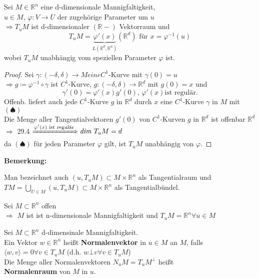 \begin{sa}
Sei $M \in \mathbb{R}^n $ eine d-dimensionale Mannigfaltigkeit, \\
$u \in M $, $ \varphi : V \rightarrow U $ der zugehörige Parameter um $u$ \\
$\Longrightarrow T_uM $ ist d-dimensionaler $( \mathbb{R}-) $ Vektorraum und \\
    \begin{equation}
    T_uM = \underbrace{\varphi'(x)}_{L \left( \mathbb{R}^d, \mathbb{R}^n \right) }
    \left( \mathbb{R}^d \right) \text{ für } x = \varphi^{-1} (u) 
    \end{equation}
wobei $T_uM$ unabhängig vom speziellen Parameter $\varphi$ ist.
\end{sa}

\begin{proof}
Sei $\gamma: (-\delta, \delta) \rightarrow M eine C^1$-Kurve mit $\gamma(0) = u $ \\
$\Rightarrow g \coloneqq \varphi^{-1} \circ \gamma $ ist $C^1$-Kurve, 
$g: (-\delta, \delta) \rightarrow \mathbb{R}^d $ mit $ g(0) = x $ und
    \begin{equation*}
    \gamma' (0) = \varphi' (x) g'(0) \text{, } \varphi' (x) \text{ist regulär.}
    \tag{$\spadesuit$}
    \end{equation*}
Offenb. liefert auch jede $C^1$-Kurve $g$ in $\mathbb{R}^d $ durch $x$
eine $C^1$-Kurve $\gamma$ in $M$ mit $(\spadesuit)$ \\
Die Menge aller Tangentialvektoren $g'(0)$ von $C^1$-Kurven $g$ in $\mathbb{R}^d $
ist offenbar $\mathbb{R}^d $ \\
$\Rightarrow $ 
29.4 $ \xRightarrow{\varphi' (x) \text{ ist regulär}} \textit{dim } T_uM = d $ \\
da $(\spadesuit)$ für jeden Parameter $\varphi$ gilt, ist $T_uM$ unabhängig von $\varphi$.
\end{proof}

\textbf{Bemerkung:}
\par \noindent
Man bezeichnet auch $(u, T_uM) \subset M \times \mathbb{R}^n$
als Tangentialraum und \\
$TM = \bigcup\limits_{U \in M} (u, T_uM) \subset M \times \mathbb{R}^n $
als Tangentialbündel.

\begin{beispiel}
Sei $M \subset \mathbb{R}^n $ offen  \\
$\Rightarrow $ $M$ ist ist n-dimensionale Mannigfaltigkeit und 
$T_uM = \mathbb{R}^n \forall u \in M $
\end{beispiel}

\begin{definition}
Sei $M \subset \mathbb{R}^n $ d-dimensinale Mannigfaltigkeit. \\
Ein Vektor $w \in \mathbb{R}^n $ heißt \textbf{Normalenvektor} in $u \in M $ an $M$, falls\\
$\langle w,v \rangle = 0 \forall v \in T_uM $
(d.h. $w \bot v \forall v \in T_uM$) \\
Die Menge aller Normalenvektoren $N_uM = T_uM^{\bot} $ heißt \\
\textbf{Normalenraum} von $M$ in $u$. 
\end{definition}